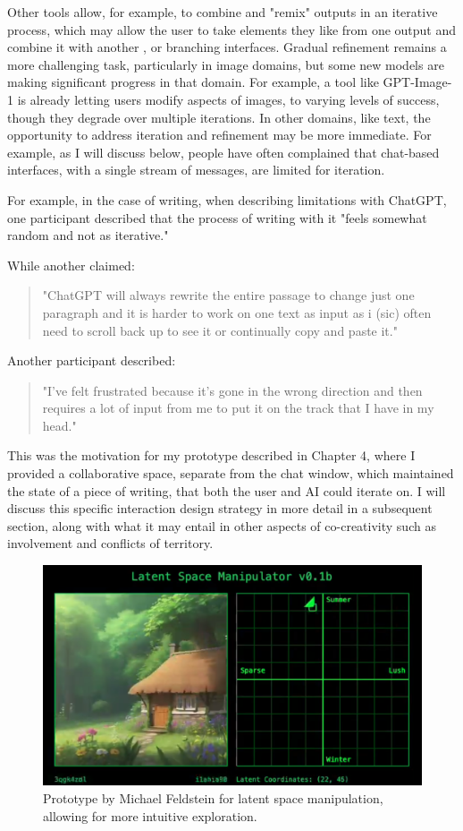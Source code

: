 Other tools allow, for example, to combine and "remix" outputs in an iterative process, which may allow the user to take elements they like from one output and combine it with another \cite{Zhou2024-vp}, or branching interfaces. Gradual refinement remains a more challenging task, particularly in image domains, but some new models are making significant progress in that domain. For example, a tool like GPT-Image-1 is already letting users modify aspects of images, to varying levels of success, though they degrade over multiple iterations. In other domains, like text, the opportunity to address iteration and refinement may be more immediate. For example, as I will discuss below, people have often complained that chat-based interfaces, with a single stream of messages, are limited for iteration.

For example, in the case of writing, when describing limitations with ChatGPT, one participant described that the process of writing with it "feels somewhat random and not as iterative."

While another claimed:

\begin{quote}
"ChatGPT will always rewrite the entire passage to change just one paragraph and it is harder to work on one text as input as i (sic) often need to scroll back up to see it or continually copy and paste it."
\end{quote}
Another participant described:
\begin{quote}
"I’ve felt frustrated because it’s gone in the wrong direction and then requires a lot of input from me to put it on the track that I have in my head."
\end{quote}

This was the motivation for my prototype described in Chapter 4, where I provided a collaborative space, separate from the chat window, which maintained the state of a piece of writing, that both the user and AI could iterate on. I will discuss this specific interaction design strategy in more detail in a subsequent section, along with what it may entail in other aspects of co-creativity such as involvement and conflicts of territory.

\begin{figure}[H]
    \centering
    \includegraphics[width=0.8\linewidth]{latentspacemanip.png}
    \caption{Prototype by Michael Feldstein for latent space manipulation, allowing for more intuitive exploration.}
    \label{fig:feldstein}
\end{figure}

